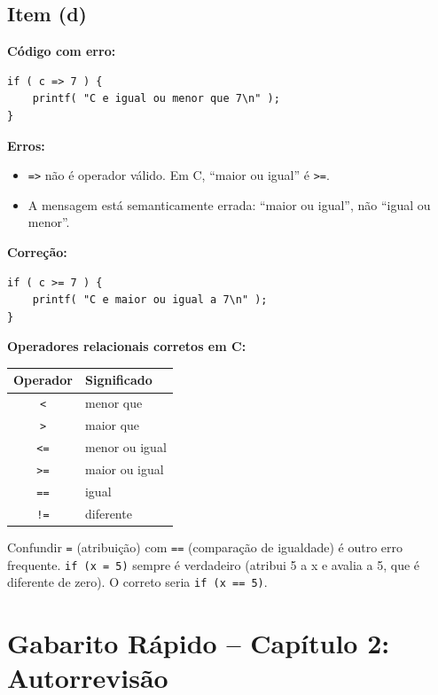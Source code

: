 \documentclass[12pt,a4paper]{article}
\begin{document}
\subsection*{Item (d)}
\begin{respostabox}
\textbf{Código com erro:}
\begin{lstlisting}
if ( c => 7 ) {
    printf( "C e igual ou menor que 7\n" );
}
\end{lstlisting}

\textbf{Erros:}
\begin{itemize}[noitemsep]
  \item \texttt{=>} não é operador válido. Em C, ``maior ou igual'' é \texttt{>=}.
  \item A mensagem está semanticamente errada: ``maior ou igual'', não ``igual ou
  menor''.
\end{itemize}

\textbf{Correção:}
\begin{lstlisting}
if ( c >= 7 ) {
    printf( "C e maior ou igual a 7\n" );
}
\end{lstlisting}

\textbf{Operadores relacionais corretos em C:}
\begin{center}
\renewcommand{\arraystretch}{1.2}
\begin{tabular}{c l}
\toprule
\textbf{Operador} & \textbf{Significado} \\ \midrule
\texttt{<}  & menor que \\
\texttt{>}  & maior que \\
\texttt{<=} & menor ou igual \\
\texttt{>=} & maior ou igual \\
\texttt{==} & igual \\
\texttt{!=} & diferente \\
\bottomrule
\end{tabular}
\end{center}

\begin{erroco}
  Confundir \texttt{=} (atribuição) com \texttt{==} (comparação de igualdade) é
  outro erro frequente. \texttt{if (x = 5)} sempre é verdadeiro (atribui 5 a x e
  avalia a 5, que é diferente de zero). O correto seria \texttt{if (x == 5)}.
\end{erroco}
\end{respostabox}

\newpage

\section*{Gabarito Rápido -- Capítulo 2: Autorrevisão}
\end{document}
